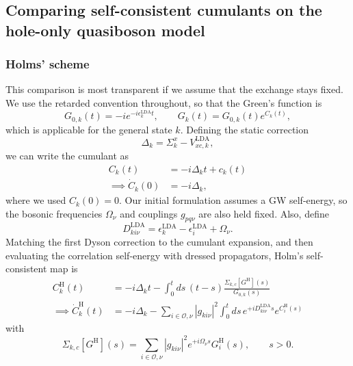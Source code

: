 \subsection{Comparing self-consistent cumulants on the hole-only quasiboson model}
\subsubsection{Holms' scheme}
This comparison is most transparent if we assume that the exchange stays fixed.
We use the retarded convention throughout, so that the Green's function is
\begin{equation}
    G_{0,k}(t)
    =
    -i e^{-i\epsilon_k^{\mathrm{LDA}}t},
    \qquad
    G_k(t)
    =
    G_{0,k}(t)e^{C_k(t)},
\end{equation}
which is applicable for the general state $k$. Defining the
 static correction
\begin{equation}
    \Delta_k
    =
    \Sigma_{k}^x
    -
    V_{xc,k}^{\mathrm{LDA}},
\end{equation}
we can write the cumulant as
\begin{align}
    C_k(t)
    &=
    -i\Delta_k t+c_k(t)\\
\implies 
    \dot C_k(0)&=-i\Delta_k,
\end{align}
where we used $C_k(0)=0$. Our initial formulation assumes a GW self-energy, so the bosonic frequencies $\Omega_\nu$ and couplings $g_{pq\nu}$ are also
held fixed. Also, define
\begin{equation}
    D_{ki\nu}^{\mathrm{LDA}}
    =
    \epsilon_k^{\mathrm{LDA}}
    -
    \epsilon_i^{\mathrm{LDA}}
    +
    \Omega_\nu.
\end{equation}
Matching the first Dyson correction to the cumulant expansion, and
then evaluating the correlation self-energy with dressed propagators,
Holm's self-consistent map is
\begin{align}
    C_k^{\mathrm H}(t)
    &=
    -i\Delta_k t
    -
    \int_0^t ds\,(t-s)
    \frac{\Sigma_{k,c}[G^{\mathrm H}](s)}{G_{0,k}(s)}\\
\implies 
    \dot C_k^{\mathrm H}(t)
    &=
    -i\Delta_k
    -
    \sum_{i\in\mathcal{O},\nu}|g_{ki\nu}|^2
    \int_0^t ds\,
    e^{+iD_{ki\nu}^{\mathrm{LDA}}s}
    e^{C^{\mathrm H}_i(s)}
\end{align}
with
\begin{equation}
    \Sigma_{k,c}[G^{\mathrm H}](s)
    =
    \sum_{i\in\mathcal O,\nu}
    |g_{ki\nu}|^2
    e^{+i\Omega_\nu s}G^{\mathrm H}_i(s),
    \qquad s>0.
\end{equation}
